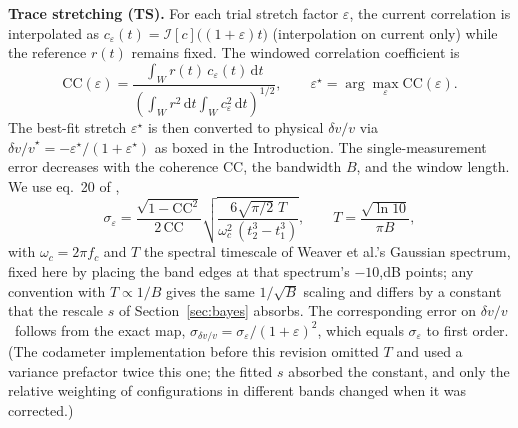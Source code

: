 \documentclass[
  referee]{gji}
\providecommand{\dvv}{\ensuremath{\delta v/v}}
\begin{document}
\textbf{Trace stretching (TS).} For each trial stretch factor
\(\varepsilon\), the current correlation is interpolated as
\(c_\varepsilon(t)=\mathcal{I}[c]\big((1+\varepsilon)t\big)\)
(interpolation on current only) while the reference \(r(t)\) remains
fixed. The windowed correlation coefficient is \begin{equation}
\mathrm{CC}(\varepsilon) = \frac{\int_W r(t)\,c_\varepsilon(t)\,\mathrm{d}t}
{\left(\int_W r^2\,\mathrm{d}t\int_W c_\varepsilon^2\,\mathrm{d}t\right)^{1/2}},
\qquad \varepsilon^\star = \arg\max_\varepsilon \mathrm{CC}(\varepsilon).
\end{equation} The best-fit stretch \(\varepsilon^\star\) is then
converted to physical \(\dvv\) via
\(\dvv^\star = -\varepsilon^\star/(1+\varepsilon^\star)\) as boxed in
the Introduction. The single-measurement error decreases with the
coherence \(\mathrm{CC}\), the bandwidth \(B\), and the window length.
We use eq.~20 of \citet{Weaver2011}, \begin{equation}
\sigma_{\varepsilon} = \frac{\sqrt{1-\mathrm{CC}^2}}{2\,\mathrm{CC}}
\sqrt{\frac{6\sqrt{\pi/2}\;T}{\omega_c^2\,(t_2^3-t_1^3)}},
\qquad T=\frac{\sqrt{\ln 10}}{\pi B},
\label{eq:weaver}
\end{equation} with \(\omega_c=2\pi f_c\) and \(T\) the spectral
timescale of Weaver et al.'s Gaussian spectrum, fixed here by placing
the band edges at that spectrum's \(-10\),dB points; any convention with
\(T\propto 1/B\) gives the same \(1/\sqrt{B}\) scaling and differs by a
constant that the rescale \(s\) of Section~\ref{sec:bayes} absorbs. The
corresponding error on \dvv~follows from the exact map,
\(\sigma_{\dvv}=\sigma_{\varepsilon}/(1+\varepsilon)^2\), which equals
\(\sigma_{\varepsilon}\) to first order. (The codameter implementation
before this revision omitted \(T\) and used a variance prefactor twice
this one; the fitted \(s\) absorbed the constant, and only the relative
weighting of configurations in different bands changed when it was
corrected.)
\end{document}
